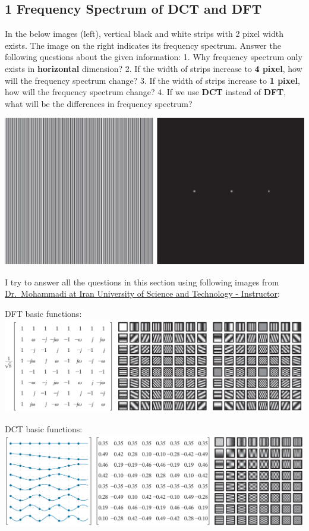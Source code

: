 \documentclass[11pt]{article}
\makeatletter
\def\maxwidth{\ifdim\Gin@nat@width>\linewidth\linewidth
    \else\Gin@nat@width\fi}
\let\Oldincludegraphics\includegraphics
\renewcommand{\includegraphics}[1]{\Oldincludegraphics[width=.8\maxwidth]{#1}}
\makeatother
\begin{document}
    \hypertarget{frequency-spectrum-of-dct-and-dft}{%
\subsection{1 Frequency Spectrum of DCT and
DFT}\label{frequency-spectrum-of-dct-and-dft}}

In the below images (left), vertical black and white strips with 2 pixel
width exists. The image on the right indicates its frequency spectrum.
Answer the following questions about the given information: 1. Why
frequency spectrum only exists in \textbf{horizontal} dimension? 2. If
the width of strips increase to \textbf{4 pixel}, how will the frequency
spectrum change? 3. If the width of strips increase to \textbf{1 pixel},
how will the frequency spectrum change? 4. If we use \textbf{DCT}
instead of \textbf{DFT}, what will be the differences in frequency
spectrum?

\includegraphics{wiki/q01.jpg}

    I try to answer all the questions in this section using following images
from \protect\hyperlink{}{Dr.~Mohammadi at Iran University of Science
and Technology - Instructor}:

DFT basic functions: \includegraphics{wiki/dft-table.jpg}

DCT basic functions: \includegraphics{wiki/dct-table.jpg}
\end{document}

